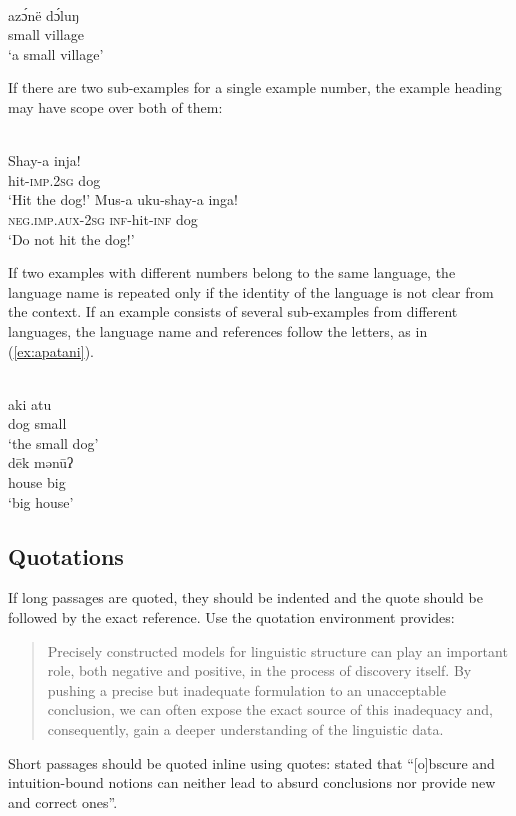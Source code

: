 {\def\exfont{\normalsize\itshape}
\ea\label{ex-typology}
\\
\gll azɔ́në dɔ́luŋ\\
     small village\\ 
\glt `a small village' 
\z


If there are two sub-examples for a single example number, the example heading may have scope over both of them:

\ea
{}\\
\ea
\gll Shay-a		inja!\\
hit-\textsc{imp.2sg}	dog\\
\glt `Hit the dog!'
\ex
\gll	Mus-a	uku-shay-a	inga! \\
	\textsc{neg.imp.aux-2sg}	\textsc{inf}-hit-\textsc{inf}	dog \\
\glt		`Do not hit the dog!'	
\z
\z

If two examples with different numbers belong to the same language, the language name is repeated only if the identity of the language is not clear from the context. If an example consists of several sub-examples from different languages, the language name and references follow the letters, as in (\ref{ex:apatani}).

\ea\label{ex:apatani}
\ea
{}\\
\gll aki atu\\ 
     dog small\\ 
\glt ‘the small dog’ 
\ex 
{}\\ 
\gll dēk mənūʔ\\
     house big\\
\glt ‘big house’ 
\z
\z



\subsection{Quotations}

If long passages are quoted, they should be indented and the quote should be followed by the exact reference. Use the quotation environment \latex provides:
\begin{quotation}
Precisely constructed models for linguistic structure can play an
important role, both negative and positive, in the process of discovery 
itself. By pushing a precise but inadequate formulation to
an unacceptable conclusion, we can often expose the exact source
of this inadequacy and, consequently, gain a deeper understanding
of the linguistic data.
\citep[5]{Chomsky57a}
\end{quotation}
%
Short passages should be quoted inline using quotes: \citet[5]{Chomsky57a} stated that ``[o]bscure
  and intuition-bound notions can neither lead to absurd conclusions nor provide new and
correct ones''.

}
